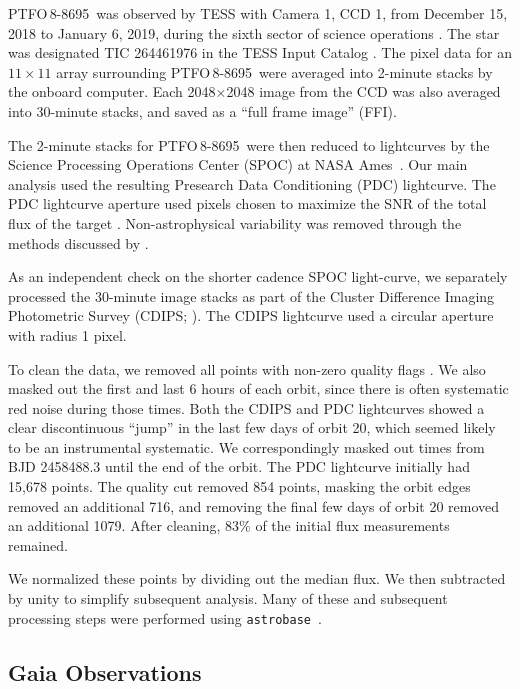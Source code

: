 \documentclass[12pt,twocolumn,tighten]{aastex62}
\newcommand{\ptfo}{PTFO$\,$8-8695}
\begin{document}
\ptfo\ was observed by TESS with Camera 1, CCD 1, from December
15, 2018 to January 6, 2019, during the sixth sector of science
operations \citep{ricker_transiting_2015}.  The star was designated
TIC 264461976 in the TESS Input Catalog
\citep{stassun_TIC_2018,stassun_TIC8_2019}.  The pixel data for an
$11\times11$ array surrounding \ptfo\ were averaged into 2-minute
stacks by the onboard computer.  Each 2048$\times$2048 image from the
CCD was also averaged into 30-minute stacks, and saved as a ``full
frame image'' (FFI).

The 2-minute stacks for \ptfo\ were then reduced to lightcurves
by the Science Processing Operations Center (SPOC) at NASA
Ames~\citep{jenkins_tess_2016}.  Our main analysis used the resulting
Presearch Data Conditioning (PDC) lightcurve.  The PDC lightcurve
aperture used pixels chosen to maximize the SNR of the total flux of
the target \citep{smith_kepler_apertures_2017}.  Non-astrophysical
variability was removed through the methods discussed by
\citet{smith_kepler_PDC_2017}.

As an independent check on the shorter cadence SPOC light-curve, we
separately processed the 30-minute image stacks as part of the Cluster
Difference Imaging Photometric Survey (CDIPS;
\citealt{bouma_cluster_2019}).  The CDIPS lightcurve used a circular
aperture with radius 1 pixel.

To clean the data, we removed all points with non-zero quality flags
\citep[{\it e.g.},][]{tess_data_product_description_2018}.  We also
masked out the first and last 6 hours of each orbit, since there is
often systematic red noise during those times.  Both the CDIPS and PDC
lightcurves showed a clear discontinuous ``jump'' in the last few days
of orbit 20, which seemed likely to be an instrumental systematic.  We
correspondingly masked out times from BJD 2458488.3 until the end of
the orbit.  The PDC lightcurve initially had 15{,}678 points.  The
quality cut removed 854 points, masking the orbit edges removed an
additional 716, and removing the final few days of orbit 20 removed an
additional 1079.  After cleaning, 83\% of the initial flux
measurements remained.

We normalized these points by dividing out the median flux. We then
subtracted by unity to simplify subsequent analysis.  Many of these
and subsequent processing steps were performed using
\texttt{astrobase}~\citep{bhatti_astrobase_2018}. 


\subsection{Gaia Observations}
\end{document}
